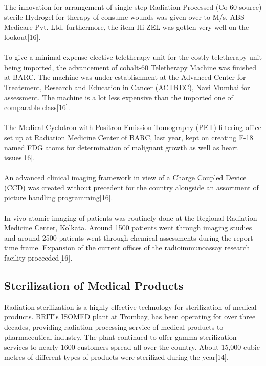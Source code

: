 \documentclass[12pt]{article}
\begin{document}
\\
\\
The innovation for arrangement of single step Radiation Processed (Co-60 source) sterile Hydrogel for therapy of consume wounds was given over to M/s. ABS Medicare Pvt. Ltd. furthermore, the item Hi-ZEL was gotten very well on the lookout[16].
\\
\\
To give a minimal expense elective teletherapy unit for the costly teletherapy unit being imported, the advancement of cobalt-60 Teletherapy Machine was finished at BARC. The machine was under establishment at the Advanced Center for Treatement, Research and Education in Cancer (ACTREC), Navi Mumbai for assessment. The machine is a lot less expensive than the imported one of comparable class[16].
\\
\\
The Medical Cyclotron with Positron Emission Tomography (PET) filtering office set up at Radiation Medicine Center of BARC, last year, kept on creating F-18 named FDG atoms for determination of malignant growth as well as heart issues[16].
\\
\\
An advanced clinical imaging framework in view of a Charge Coupled Device (CCD) was created without precedent for the country alongside an assortment of picture handling programming[16].
\\
\\
In-vivo atomic imaging of patients was routinely done at the Regional Radiation Medicine Center, Kolkata. Around 1500 patients went through imaging studies and around 2500 patients went through chemical assessments during the report time frame. Expansion of the current offices of the radioimmunoassay research facility proceeded[16].
\subsection{Sterilization of Medical Products}
Radiation sterilization is a highly effective technology for sterilization of medical products. BRIT’s ISOMED plant at Trombay, has been operating for over three decades, providing radiation processing service of medical products to pharmaceutical industry. The plant continued to offer gamma sterilization services to nearly 1600 customers spread all over the country. About 15,000 cubic metres of different types of products were sterilized during the year[14].
\\
\end{document}
